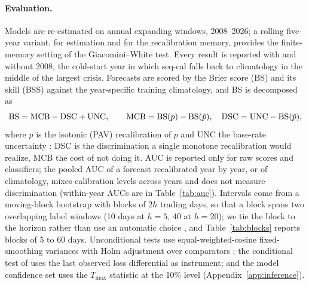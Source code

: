 \documentclass[preprint,12pt,authoryear]{elsarticle}
\begin{document}
\paragraph{Evaluation.} Models are re-estimated on annual expanding windows, 2008--2026; a rolling five-year variant, for estimation and for the recalibration memory, provides the finite-memory setting of the Giacomini--White test. Every result is reported with and without 2008, the cold-start year in which seq-cal falls back to climatology in the middle of the largest crisis. Forecasts are scored by the Brier score (BS) and its skill (BSS) against the year-specific training climatology, and BS is decomposed as
\begin{equation}
{\rm BS}={\rm MCB}-{\rm DSC}+{\rm UNC},\qquad {\rm MCB}={\rm BS}(p)-{\rm BS}(\hat p),\quad {\rm DSC}={\rm UNC}-{\rm BS}(\hat p),
\end{equation}
where $\hat p$ is the isotonic (PAV) recalibration of $p$ and UNC the base-rate uncertainty \citep{dimitriadis2021}: DSC is the discrimination a single monotone recalibration would realize, MCB the cost of not doing it. AUC is reported only for raw scores and classifiers; the pooled AUC of a forecast recalibrated year by year, or of climatology, mixes calibration levels across years and does not measure discrimination (within-year AUCs are in Table~\ref{tab:auc}). Intervals come from a moving-block bootstrap \citep{kunsch1989} with blocks of $2h$ trading days, so that a block spans two overlapping label windows (10 days at $h=5$, 40 at $h=20$); we tie the block to the horizon rather than use an automatic choice \citep{politis2004}, and Table~\ref{tab:blocks} reports blocks of 5 to 60 days. Unconditional tests use equal-weighted-cosine fixed-smoothing variances \citep{lazarus2018} with Holm adjustment over comparators \citep{holm1979}; the conditional test of \citet{giacomini2006} uses the last observed loss differential as instrument; and the model confidence set \citep{hansen2011} uses the $T_{\max}$ statistic at the 10\% level (Appendix~\ref{app:inference}).
\end{document}

